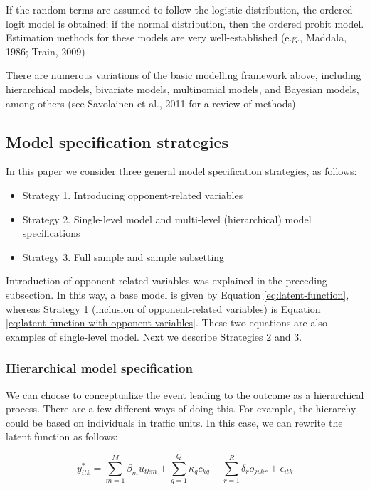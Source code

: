 \documentclass[]{elsarticle} %
\providecommand{\tightlist}{%
  \setlength{\itemsep}{0pt}\setlength{\parskip}{0pt}}
\begin{document}
If the random terms are assumed to follow the logistic distribution, the
ordered logit model is obtained; if the normal distribution, then the
ordered probit model. Estimation methods for these models are very
well-established (e.g., Maddala, 1986; Train, 2009)

There are numerous variations of the basic modelling framework above,
including hierarchical models, bivariate models, multinomial models, and
Bayesian models, among others (see Savolainen et al., 2011 for a review
of methods).

\hypertarget{model-specification-strategies}{%
\subsection{Model specification
strategies}\label{model-specification-strategies}}

In this paper we consider three general model specification strategies,
as follows:

\begin{itemize}
\tightlist
\item
  Strategy 1. Introducing opponent-related variables
\item
  Strategy 2. Single-level model and multi-level (hierarchical) model
  specifications
\item
  Strategy 3. Full sample and sample subsetting
\end{itemize}

Introduction of opponent related-variables was explained in the
preceding subsection. In this way, a base model is given by Equation
\ref{eq:latent-function}, whereas Strategy 1 (inclusion of
opponent-related variables) is Equation
\ref{eq:latent-function-with-opponent-variables}. These two equations
are also examples of single-level model. Next we describe Strategies 2
and 3.

\hypertarget{hierarchical-model-specification}{%
\subsubsection{Hierarchical model
specification}\label{hierarchical-model-specification}}

We can choose to conceptualize the event leading to the outcome as a
hierarchical process. There are a few different ways of doing this. For
example, the hierarchy could be based on individuals in traffic units.
In this case, we can rewrite the latent function as follows:

\begin{equation}
\label{eq:latent-function-with-hierarchical-traffic-unit}
y_{itk}^*=\sum_{m=1}^M\beta_mu_{tkm} + \sum_{q=1}^Q\kappa_qc_{kq} + \sum_{r=1}^R\delta_ro_{jvkr} + \epsilon_{itk}
\end{equation}
\end{document}
